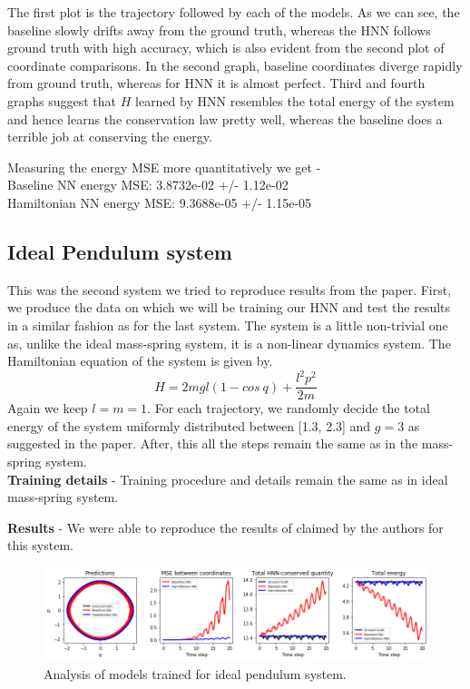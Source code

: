 The first plot is the trajectory followed by each of the models. As we can see, the baseline slowly drifts away from the ground truth, whereas the HNN follows ground truth with high accuracy, which is also evident from the second plot of coordinate comparisons. In the second graph, baseline coordinates diverge rapidly from ground truth, whereas for HNN it is almost perfect. Third and fourth graphs suggest that \(H\) learned by HNN resembles the total energy of the system and hence learns the conservation law pretty well, whereas the baseline does a terrible job at conserving the energy.

Measuring the energy MSE more quantitatively we get -\\
Baseline NN energy MSE: \quad 3.8732e-02 +/- 1.12e-02\\
Hamiltonian NN energy MSE: \quad 9.3688e-05 +/- 1.15e-05

\subsection{Ideal Pendulum system}
This was the second system we tried to reproduce results from the paper. First, we produce the data on which we will be training our HNN and test the results in a similar fashion as for the last system. The system is a little non-trivial one as, unlike the ideal mass-spring system, it is a non-linear dynamics system. The Hamiltonian equation of the system is given by.
\begin{equation}
H = 2mgl(1 - cos\:q) + \frac{l^2 p^2}{2m}
\end{equation}
Again we keep \(l = m = 1\). For each trajectory, we randomly decide the total energy of the system uniformly distributed between [1.3, 2.3] and \(g = 3\) as suggested in the paper. After, this all the steps remain the same as in the mass-spring system.\\
\textbf{Training details} - Training procedure and details remain the same as in ideal mass-spring system.

\textbf{Results} - We were able to reproduce the results of claimed by the authors for this system.
\begin{figure}[htp]
    \centering
    \includegraphics[width=15cm]{../openreview/download1.png}
    \caption{Analysis of models trained for ideal pendulum system.}
    \label{fig:galaxy}
\end{figure}

